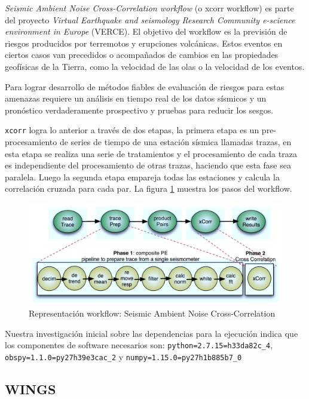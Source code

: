 \textit{Seismic Ambient Noise Cross-Correlation workflow} (o xcorr workflow) es parte del proyecto \textit{Virtual Earthquake and seismology Research Community e-science environment in Europe} (VERCE). 
El objetivo del workflow es la previsión de riesgos producidos por terremotos y erupciones volcánicas. Estos eventos en ciertos casos van precedidos o acompañados de cambios en las propiedades geofísicas de la Tierra, como la velocidad de las olas o la velocidad de los eventos. 

Para lograr desarrollo de métodos fiables de evaluación de riesgos para estas amenazas requiere un análisis en tiempo real de los datos sísmicos y un pronóstico verdaderamente prospectivo y pruebas para reducir los sesgos.

\texttt{xcorr} logra lo anterior a través de dos etapas, la primera etapa es un pre-procesamiento de series de tiempo de una estación sísmica llamadas trazas, en esta etapa se realiza una serie de tratamientos y el procesamiento de cada traza es independiente del procesamiento de otras trazas, haciendo que esta fase sea paralela. 
Luego la segunda etapa empareja todas las estaciones y calcula la correlación cruzada para cada par. La figura \ref{fig:xcorr} muestra los pasos del workflow.


\begin{figure}[t]
\centering
\includegraphics[width=.8\textwidth]{Figures/xcorr}
\caption[Representación workflow: Seismic Ambient Noise Cross-Correlation]{Representación workflow: Seismic Ambient Noise Cross-Correlation}\label{fig:xcorr}
\end{figure}


Nuestra investigación inicial sobre las dependencias para la ejecución indica que los componentes de software necesarios son: \verb|python=2.7.15=h33da82c_4|, \verb|obspy=1.1.0=py27h39e3cac_2| y \verb|numpy=1.15.0=py27h1b885b7_0|



\subsection{WINGS}

